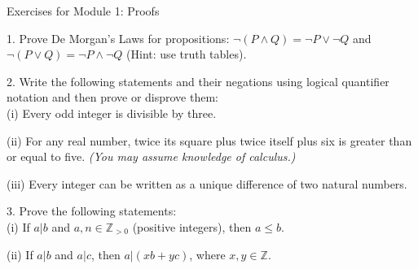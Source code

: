 \documentclass{article}
\theoremstyle{remark} %
\newcommand{\Z}{{\mathbb{Z}}}
\begin{document}
\begin{center}
\Large{Exercises for Module 1: Proofs}
\end{center}


1.  Prove De Morgan's Laws for propositions: $\neg (P \wedge Q) = \neg P \vee \neg Q$ and $\neg (P \vee Q) = \neg P \wedge \neg Q$ (Hint: use truth tables).

\vspace{11cm} %



2. Write the following statements and their negations using logical quantifier notation and then prove or disprove them: \\
(i) Every odd integer is divisible by three.

\vspace{9cm} %


(ii) For any real number, twice its square plus twice itself plus six is greater than or equal to five. \textit{(You may assume knowledge of calculus.)}

\vspace{7cm} %


(iii) Every integer can be written as a unique difference of two natural numbers.


\vspace{7cm} %



3. Prove the following statements: \\
(i) If $a | b$ and $a,n \in \Z_{>0}$ (positive integers), then $a \leq b$.

\vspace{11cm} %



(ii) If $a | b$ and $a | c$, then $a | (x b + y c)$, where $x,y \in \Z$.
\end{document}

